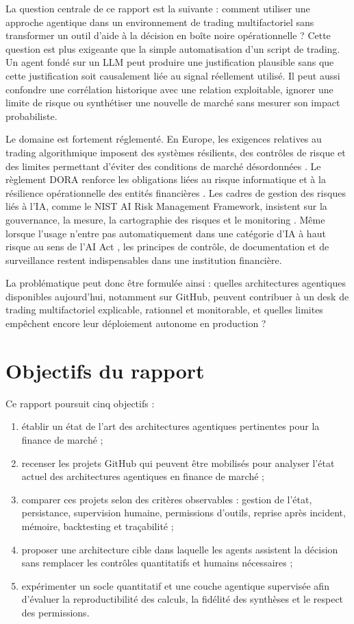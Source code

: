 La question centrale de ce rapport est la suivante : comment utiliser une approche agentique dans un environnement de trading multifactoriel sans transformer un outil d'aide à la décision en boîte noire opérationnelle ? Cette question est plus exigeante que la simple automatisation d'un script de trading. Un agent fondé sur un LLM peut produire une justification plausible sans que cette justification soit causalement liée au signal réellement utilisé. Il peut aussi confondre une corrélation historique avec une relation exploitable, ignorer une limite de risque ou synthétiser une nouvelle de marché sans mesurer son impact probabiliste.

Le domaine est fortement réglementé. En Europe, les exigences relatives au trading algorithmique imposent des systèmes résilients, des contrôles de risque et des limites permettant d'éviter des conditions de marché désordonnées \citep{mifidArticle17}. Le règlement DORA renforce les obligations liées au risque informatique et à la résilience opérationnelle des entités financières \citep{dora2022}. Les cadres de gestion des risques liés à l'IA, comme le NIST AI Risk Management Framework, insistent sur la gouvernance, la mesure, la cartographie des risques et le monitoring \citep{nistAirmf2023}. Même lorsque l'usage n'entre pas automatiquement dans une catégorie d'IA à haut risque au sens de l'AI Act \citep{euAiAct2024}, les principes de contrôle, de documentation et de surveillance restent indispensables dans une institution financière.

La problématique peut donc être formulée ainsi : quelles architectures agentiques disponibles aujourd'hui, notamment sur GitHub, peuvent contribuer à un desk de trading multifactoriel explicable, rationnel et monitorable, et quelles limites empêchent encore leur déploiement autonome en production ?

\section{Objectifs du rapport}

Ce rapport poursuit cinq objectifs :
\begin{enumerate}
    \item établir un état de l'art des architectures agentiques pertinentes pour la finance de marché ;
    \item recenser les projets GitHub qui peuvent être mobilisés pour analyser l'état actuel des architectures agentiques en finance de marché ;
    \item comparer ces projets selon des critères observables : gestion de l'état, persistance, supervision humaine, permissions d'outils, reprise après incident, mémoire, backtesting et traçabilité ;
    \item proposer une architecture cible dans laquelle les agents assistent la décision sans remplacer les contrôles quantitatifs et humains nécessaires ;
    \item expérimenter un socle quantitatif et une couche agentique supervisée afin d'évaluer la reproductibilité des calculs, la fidélité des synthèses et le respect des permissions.
\end{enumerate}

